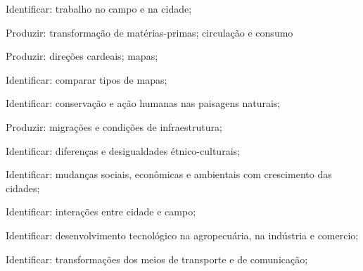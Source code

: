  Identificar: trabalho no campo e na cidade;

 Produzir: transformação de matérias-primas; circulação e consumo

 Produzir: direções cardeais; mapas; 

 Identificar: comparar tipos de mapas;

 Identificar: conservação e ação humanas nas paisagens naturais;

 Produzir: migrações e condições de infraestrutura;

 Identificar: diferenças e desigualdades étnico-culturais;

 Identificar: mudanças sociais, econômicas e ambientais com crescimento das cidades;

 Identificar: interações entre cidade e campo;

 Identificar:  desenvolvimento tecnológico na agropecuária, na indústria e comercio;

 Identificar: transformações dos meios de transporte e de comunicação;

